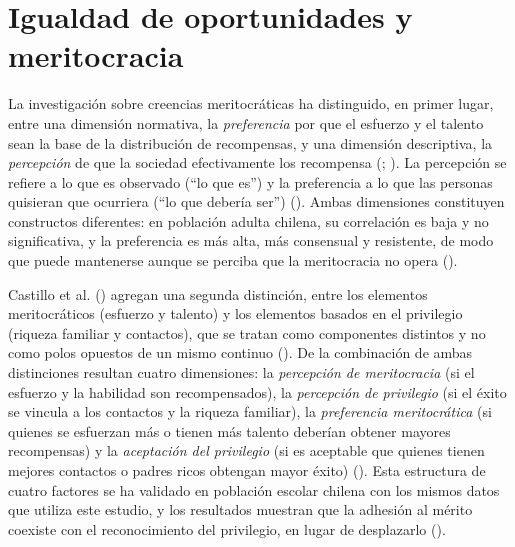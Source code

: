 \documentclass[
  spanish,
  a4paper,
  oneside]{scrbook}
\begin{document}
\section{Igualdad de oportunidades y
meritocracia}\label{igualdad-de-oportunidades-y-meritocracia}

La investigación sobre creencias meritocráticas ha distinguido, en
primer lugar, entre una dimensión normativa, la \emph{preferencia} por
que el esfuerzo y el talento sean la base de la distribución de
recompensas, y una dimensión descriptiva, la \emph{percepción} de que la
sociedad efectivamente los recompensa
(;
). La
percepción se refiere a lo que es observado (``lo que es'') y la
preferencia a lo que las personas quisieran que ocurriera (``lo que
debería ser'') (). Ambas dimensiones constituyen constructos diferentes: en
población adulta chilena, su correlación es baja y no significativa, y
la preferencia es más alta, más consensual y resistente, de modo que
puede mantenerse aunque se perciba que la meritocracia no opera
().

Castillo et al. ()
agregan una segunda distinción, entre los elementos meritocráticos
(esfuerzo y talento) y los elementos basados en el privilegio (riqueza
familiar y contactos), que se tratan como componentes distintos y no
como polos opuestos de un mismo continuo
(). De la
combinación de ambas distinciones resultan cuatro dimensiones: la
\emph{percepción de meritocracia} (si el esfuerzo y la habilidad son
recompensados), la \emph{percepción de privilegio} (si el éxito se
vincula a los contactos y la riqueza familiar), la \emph{preferencia
meritocrática} (si quienes se esfuerzan más o tienen más talento
deberían obtener mayores recompensas) y la \emph{aceptación del
privilegio} (si es aceptable que quienes tienen mejores contactos o
padres ricos obtengan mayor éxito)
(). Esta estructura
de cuatro factores se ha validado en población escolar chilena con los
mismos datos que utiliza este estudio, y los resultados muestran que la
adhesión al mérito coexiste con el reconocimiento del privilegio, en
lugar de desplazarlo ().
\end{document}
